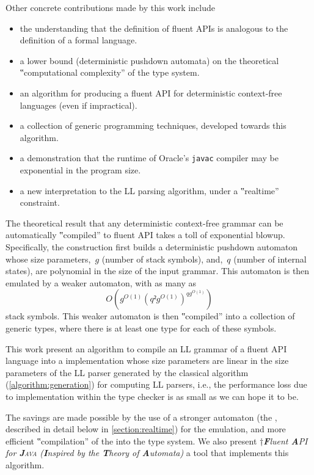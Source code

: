 Other concrete contributions made by this work include
\begin{itemize}
  \item the understanding that the definition of fluent APIs is analogous to
      the definition of a formal language.
  \item a lower bound (deterministic pushdown automata)
    on the theoretical ‟computational complexity” of the \Java type system.
  \item an algorithm for producing a fluent API for deterministic context-free languages (even if impractical).
  \item a collection of generic programming techniques, developed towards this algorithm.
  \item a demonstration that the runtime of Oracle's \texttt{javac} compiler may be exponential in the program size.
  \item a new interpretation to the LL parsing algorithm, under a ‟realtime” constraint.
\end{itemize}

The theoretical result that any deterministic context-free grammar can be
automatically ‟compiled” to fluent API takes a toll of exponential blowup.
Specifically, the construction first builds a deterministic pushdown automaton
whose size parameters,~$g$ (number of stack symbols), and,~$q$ (number of
internal states), are polynomial in the size of the input grammar. This
automaton is then emulated by a weaker automaton, with as many as
\[
  O\left(g^{O(1)}\left(q²g^{O(1)}\right)^{qg^{O(1)}}\right)
\]
stack symbols.
This weaker automaton is then ‟compiled” into a collection of generic \Java types,
where there is at least one type for each of these symbols.

This work present an algorithm to compile an LL grammar of a fluent API
language into a \Java implementation whose size parameters are linear in
the size parameters of the LL parser generated by the classical
algorithm (\cref{algorithm:generation}) for computing LL parsers,
i.e., the performance loss due to implementation within the \Java
type checker is as small as we can hope it to be.

The savings are made possible by the use of a stronger automaton (the \RLLp,
described in detail below in \cref{section:realtime}) for the emulation, and
more efficient ‟compilation” of the \RLLp into the \Java type system.
We also present \Fajita
†{\itshape \textbf Fluent \textbf API for \textbf J\textsc{ava}
  (\textbf Inspired by the \textbf Theory of \textbf Automata)
}
a \Java tool that implements this algorithm.

